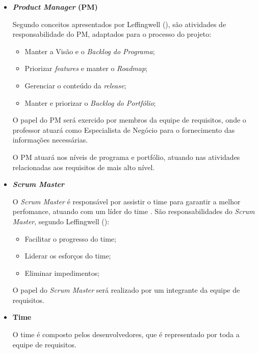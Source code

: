 \begin{itemize}
   \item \textbf{\textit{Product Manager} (PM)}
      
      Segundo conceitos apresentados por Leffingwell (\citeyear{leffingwell11}),
      são atividades de responsabilidade do PM, adaptados para o processo do projeto:
      
      \begin{itemize}
       
       \item Manter a Visão e o \textit{Backlog do Programa};
       
       \item Priorizar \textit{features} e manter o \textit{Roadmap};
       
       \item Gerenciar o conteúdo da \textit{release};
       
       \item Manter e priorizar o \textit{Backlog do Portfólio};
       
      \end{itemize}
      
      O papel do PM será exercido por membros da equipe de requisitos, onde o professor atuará como Especialista de Negócio para
      o fornecimento das informações necessárias.
      
      O PM atuará nos níveis de programa e portfólio, atuando nas atividades relacionadas
      aos requisitos de mais alto nível.
      
      
   \item \textbf{\textit{Scrum Master}}
      
      O \textit{Scrum Master} é responsável por assistir o time para garantir a melhor perfomance, atuando com 
      um líder do time \cite{leffingwell11}.
      São responsabilidades do \textit{Scrum Master}, segundo Leffingwell (\citeyear{leffingwell11}):
      
      \begin{itemize}
       
       \item Facilitar o progresso do time;
       
       \item Liderar os esforços do time;
       
       \item Eliminar impedimentos;
       
      \end{itemize}
      
      O papel do \textit{Scrum Master} será realizado por um integrante da equipe de requisitos.
      
   \item \textbf{Time}
      
      O time é composto pelos desenvolvedores, que é representado por toda a equipe de requisitos.	
      
  \end{itemize}
  
  \vfill